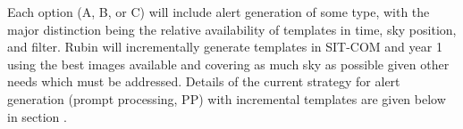 Each option (A, B, or C) will include alert generation of some type, with the major distinction being the relative availability of templates in time, sky position, and filter. 
Rubin will incrementally generate templates in SIT-COM and year 1 using the best images available and covering as much sky as possible given other needs which must be addressed.
Details of the current strategy for alert generation (prompt processing, PP) with incremental templates are given below in section .  




